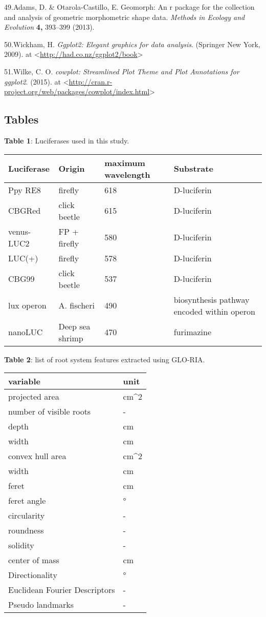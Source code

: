 \documentclass[]{article}
\begin{document}
49.Adams, D. \& Otarola-Castillo, E. Geomorph: An r package for the
collection and analysis of geometric morphometric shape data.
\emph{Methods in Ecology and Evolution} \textbf{4,} 393--399 (2013).

50.Wickham, H. \emph{Ggplot2: Elegant graphics for data analysis}.
(Springer New York, 2009). at
\textless{}\url{http://had.co.nz/ggplot2/book}\textgreater{}

51.Wilke, C. O. \emph{cowplot: Streamlined Plot Theme and Plot
Annotations for ggplot2}. (2015). at
\textless{}\url{http://cran.r-project.org/web/packages/cowplot/index.html}\textgreater{}

\pagebreak

\subsection{Tables}\label{tables}

\textbf{Table 1}: Luciferases used in this study.

\begin{longtable}[c]{@{}llll@{}}
\toprule
Luciferase & Origin & maximum wavelength & Substrate\tabularnewline
\midrule
\endhead
Ppy RE8 & firefly & 618 & D-luciferin\tabularnewline
CBGRed & click beetle & 615 & D-luciferin\tabularnewline
venus-LUC2 & FP + firefly & 580 & D-luciferin\tabularnewline
LUC(+) & firefly & 578 & D-luciferin\tabularnewline
CBG99 & click beetle & 537 & D-luciferin\tabularnewline
lux operon & A. fischeri & 490 & biosynthesis pathway encoded within
operon\tabularnewline
nanoLUC & Deep sea shrimp & 470 & furimazine\tabularnewline
\bottomrule
\end{longtable}

\textbf{Table 2}: list of root system features extracted using GLO-RIA.

\begin{longtable}[c]{@{}ll@{}}
\toprule
variable & unit\tabularnewline
\midrule
\endhead
projected area & cm\^{}2\tabularnewline
number of visible roots & -\tabularnewline
depth & cm\tabularnewline
width & cm\tabularnewline
convex hull area & cm\^{}2\tabularnewline
width & cm\tabularnewline
feret & cm\tabularnewline
feret angle & °\tabularnewline
circularity & -\tabularnewline
roundness & -\tabularnewline
solidity & -\tabularnewline
center of mass & cm\tabularnewline
Directionality & °\tabularnewline
Euclidean Fourier Descriptors & -\tabularnewline
Pseudo landmarks & -\tabularnewline
\bottomrule
\end{longtable}
\end{document}
